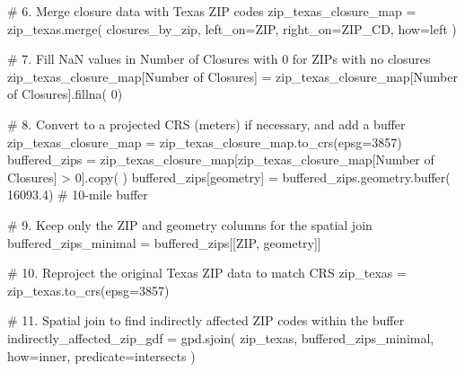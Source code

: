 \documentclass[
  letterpaper,
  DIV=11,
  numbers=noendperiod]{scrartcl}
\newenvironment{Shaded}{\begin{snugshade}}{\end{snugshade}}
\newcommand{\BuiltInTok}[1]{\textcolor[rgb]{0.00,0.23,0.31}{#1}}
\newcommand{\CommentTok}[1]{\textcolor[rgb]{0.37,0.37,0.37}{#1}}
\newcommand{\DecValTok}[1]{\textcolor[rgb]{0.68,0.00,0.00}{#1}}
\newcommand{\FloatTok}[1]{\textcolor[rgb]{0.68,0.00,0.00}{#1}}
\newcommand{\NormalTok}[1]{\textcolor[rgb]{0.00,0.23,0.31}{#1}}
\newcommand{\OperatorTok}[1]{\textcolor[rgb]{0.37,0.37,0.37}{#1}}
\newcommand{\StringTok}[1]{\textcolor[rgb]{0.13,0.47,0.30}{#1}}
\begin{document}
\begin{Shaded}
\begin{Highlighting}[]
\CommentTok{\# 6. Merge closure data with Texas ZIP codes}
\NormalTok{zip\_texas\_closure\_map }\OperatorTok{=}\NormalTok{ zip\_texas.merge(}
\NormalTok{    closures\_by\_zip, left\_on}\OperatorTok{=}\StringTok{\textquotesingle{}ZIP\textquotesingle{}}\NormalTok{, right\_on}\OperatorTok{=}\StringTok{\textquotesingle{}ZIP\_CD\textquotesingle{}}\NormalTok{, how}\OperatorTok{=}\StringTok{\textquotesingle{}left\textquotesingle{}}
\NormalTok{)}

\CommentTok{\# 7. Fill NaN values in \textquotesingle{}Number of Closures\textquotesingle{} with 0 for ZIPs with no closures}
\NormalTok{zip\_texas\_closure\_map[}\StringTok{\textquotesingle{}Number of Closures\textquotesingle{}}\NormalTok{] }\OperatorTok{=}\NormalTok{ zip\_texas\_closure\_map[}\StringTok{\textquotesingle{}Number of Closures\textquotesingle{}}\NormalTok{].fillna(}
    \DecValTok{0}\NormalTok{)}

\CommentTok{\# 8. Convert to a projected CRS (meters) if necessary, and add a buffer}
\NormalTok{zip\_texas\_closure\_map }\OperatorTok{=}\NormalTok{ zip\_texas\_closure\_map.to\_crs(epsg}\OperatorTok{=}\DecValTok{3857}\NormalTok{)}
\NormalTok{buffered\_zips }\OperatorTok{=}\NormalTok{ zip\_texas\_closure\_map[zip\_texas\_closure\_map[}\StringTok{\textquotesingle{}Number of Closures\textquotesingle{}}\NormalTok{] }\OperatorTok{\textgreater{}} \DecValTok{0}\NormalTok{].copy(}
\NormalTok{)}
\NormalTok{buffered\_zips[}\StringTok{\textquotesingle{}geometry\textquotesingle{}}\NormalTok{] }\OperatorTok{=}\NormalTok{ buffered\_zips.geometry.}\BuiltInTok{buffer}\NormalTok{(}
    \FloatTok{16093.4}\NormalTok{)  }\CommentTok{\# 10{-}mile buffer}

\CommentTok{\# 9. Keep only the ZIP and geometry columns for the spatial join}
\NormalTok{buffered\_zips\_minimal }\OperatorTok{=}\NormalTok{ buffered\_zips[[}\StringTok{\textquotesingle{}ZIP\textquotesingle{}}\NormalTok{, }\StringTok{\textquotesingle{}geometry\textquotesingle{}}\NormalTok{]]}

\CommentTok{\# 10. Reproject the original Texas ZIP data to match CRS}
\NormalTok{zip\_texas }\OperatorTok{=}\NormalTok{ zip\_texas.to\_crs(epsg}\OperatorTok{=}\DecValTok{3857}\NormalTok{)}

\CommentTok{\# 11. Spatial join to find indirectly affected ZIP codes within the buffer}
\NormalTok{indirectly\_affected\_zip\_gdf }\OperatorTok{=}\NormalTok{ gpd.sjoin(}
\NormalTok{    zip\_texas,}
\NormalTok{    buffered\_zips\_minimal,}
\NormalTok{    how}\OperatorTok{=}\StringTok{\textquotesingle{}inner\textquotesingle{}}\NormalTok{,}
\NormalTok{    predicate}\OperatorTok{=}\StringTok{\textquotesingle{}intersects\textquotesingle{}}
\NormalTok{)}


\end{Highlighting}
\end{Shaded}
\end{document}
